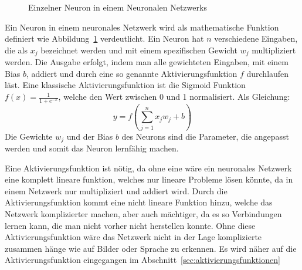 \documentclass[12pt,a4paper]{report}
\begin{document}
\begin{figure}[h]
    \centering
{}
    \caption{Einzelner Neuron in einem Neuronalen Netzwerks}
    \label{fig:neuron1}
\end{figure}

Ein Neuron in einem neuronales Netzwerk wird als mathematische Funktion definiert wie Abbildung~\ref{fig:neuron1}
verdeutlicht.
Ein Neuron hat $n$ verschiedene Eingaben, die als $x_j$ bezeichnet werden und mit einem spezifischen Gewicht $w_j$ multipliziert werden.
Die Ausgabe erfolgt, indem man alle gewichteten Eingaben, mit einem Bias $b$, addiert und durch eine so genannte
Aktivierungsfunktion $f$ durchlaufen läst.
Eine klassische Aktivierungsfunktion ist die Sigmoid Funktion $f(x) = \frac{1}{1 + e^{-x}}$, welche den Wert zwischen 0 und 1 normalisiert.
Als Gleichung:
\[y =f\left(\sum_{j=1}^{n} x_j w_j + b\right)\]
Die Gewichte $w_j$ und der Bias $b$ des Neurons sind die Parameter, die angepasst werden und somit das Neuron lernfähig machen.

Eine Aktivierungsfunktion ist nötig, da ohne eine wäre ein neuronales Netzwerk eine komplett lineare funktion, welches
nur lineare Probleme lösen könnte\cite{activations}, da in einem Netzwerk nur multipliziert und addiert wird.
Durch die Aktivierungsfunktion kommt eine nicht lineare Funktion hinzu, welche das Netzwerk komplizierter machen,
aber auch mächtiger, da es so Verbindungen lernen kann, die man nicht vorher nicht herstellen konnte.
Ohne diese Aktivierungsfunktion wäre das Netzwerk nicht in der Lage komplizierte zusammen hänge wie auf Bilder oder Sprache zu erkennen.\cite{activations}
Es wird näher auf die Aktivierungsfunktion eingegangen im Abschnitt~\ref{sec:aktivierungsfunktionen}
\end{document}
